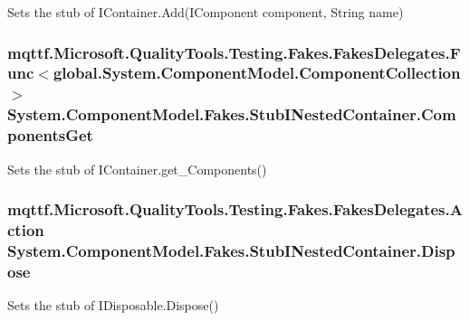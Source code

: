 Sets the stub of I\-Container.\-Add(\-I\-Component component, String name)

\hypertarget{class_system_1_1_component_model_1_1_fakes_1_1_stub_i_nested_container_a81e54304602186a1e6c293301e813ddd}{
\subsubsection[{Components\-Get}]{\setlength{\rightskip}{0pt plus 5cm}mqttf.\-Microsoft.\-Quality\-Tools.\-Testing.\-Fakes.\-Fakes\-Delegates.\-Func$<$global.\-System.\-Component\-Model.\-Component\-Collection$>$ System.\-Component\-Model.\-Fakes.\-Stub\-I\-Nested\-Container.\-Components\-Get}}\label{class_system_1_1_component_model_1_1_fakes_1_1_stub_i_nested_container_a81e54304602186a1e6c293301e813ddd}


Sets the stub of I\-Container.\-get\-\_\-\-Components()

\hypertarget{class_system_1_1_component_model_1_1_fakes_1_1_stub_i_nested_container_aa1f07ddc3eb590e01a970c4f9cdb1095}{
\subsubsection[{Dispose}]{\setlength{\rightskip}{0pt plus 5cm}mqttf.\-Microsoft.\-Quality\-Tools.\-Testing.\-Fakes.\-Fakes\-Delegates.\-Action System.\-Component\-Model.\-Fakes.\-Stub\-I\-Nested\-Container.\-Dispose}}\label{class_system_1_1_component_model_1_1_fakes_1_1_stub_i_nested_container_aa1f07ddc3eb590e01a970c4f9cdb1095}


Sets the stub of I\-Disposable.\-Dispose()

